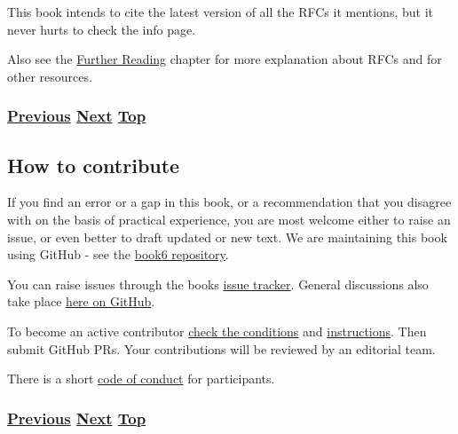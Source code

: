 \documentclass[
]{article}
\begin{document}
This book intends to cite the latest version of all the RFCs it
mentions, but it never hurts to check the info page.

Also see the \hyperref[further-reading]{Further Reading} chapter for
more explanation about RFCs and for other resources.

\subsubsection{\texorpdfstring{\hyperref[how-a-network-operations-center-sees-ipv6]{Previous}
\hyperref[how-to-contribute]{Next}
\hyperref[introduction-and-foreword]{Top}}{Previous Next Top}}\label{previous-next-top-4}

\pagebreak

\subsection{How to contribute}\label{how-to-contribute}

If you find an error or a gap in this book, or a recommendation that you
disagree with on the basis of practical experience, you are most welcome
either to raise an issue, or even better to draft updated or new text.
We are maintaining this book using GitHub - see the
\href{https://github.com/becarpenter/book6}{book6 repository}.

You can raise issues through the book\textquotesingle s
\href{https://github.com/becarpenter/book6/issues}{issue tracker}.
General discussions also take place
\href{https://github.com/becarpenter/book6/discussions}{here on GitHub}.

To become an active contributor
\href{https://github.com/becarpenter/book6/blob/main/CONTRIBUTING.md}{check
the conditions} and
\href{https://github.com/becarpenter/book6/blob/main/99.\%20Chapter\%20Template/99.\%20Chapter\%20Template.md}{instructions}.
Then submit GitHub PRs. Your contributions will be reviewed by an
editorial team.

There is a short
\href{https://github.com/becarpenter/book6/blob/main/CODE_OF_CONDUCT.md}{code
of conduct} for participants.

\subsubsection{\texorpdfstring{\hyperref[how-to-keep-up-to-date]{Previous}
\hyperref[acknowledgments]{Next}
\hyperref[introduction-and-foreword]{Top}}{Previous Next Top}}\label{previous-next-top-5}
\end{document}
